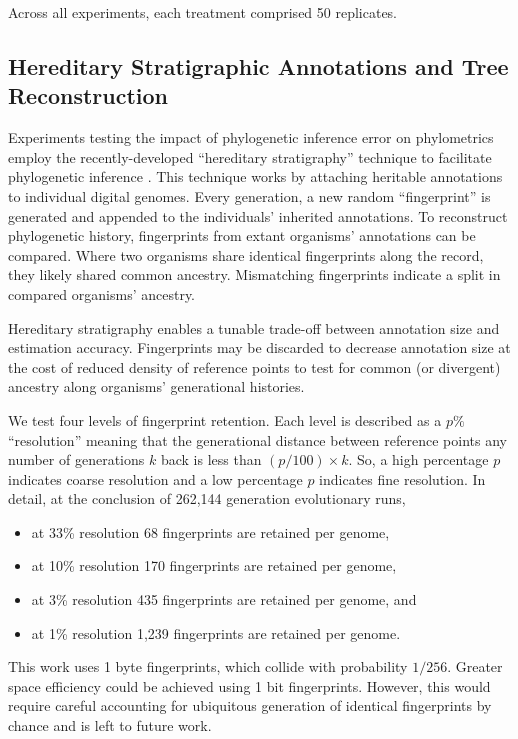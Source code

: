 Across all experiments, each treatment comprised 50 replicates.

\subsection{Hereditary Stratigraphic Annotations and Tree Reconstruction}

Experiments testing the impact of phylogenetic inference error on phylometrics employ the recently-developed ``hereditary stratigraphy'' technique to facilitate phylogenetic inference \citep{moreno2022hstrat}.
This technique works by attaching heritable annotations to individual digital genomes.
Every generation, a new random ``fingerprint'' is generated and appended to the individuals' inherited annotations.
To reconstruct phylogenetic history, fingerprints from extant organisms' annotations can be compared.
Where two organisms share identical fingerprints along the record, they likely shared common ancestry.
Mismatching fingerprints indicate a split in compared organisms' ancestry.

Hereditary stratigraphy enables a tunable trade-off between annotation size and estimation accuracy.
Fingerprints may be discarded to decrease annotation size at the cost of reduced density of reference points to test for common (or divergent) ancestry along organisms' generational histories.

We test four levels of fingerprint retention.
Each level is described as a $p\%$ ``resolution'' meaning that the generational distance between reference points any number of generations $k$ back is less than $(p / 100) \times k$.
So, a high percentage $p$ indicates coarse resolution and a low percentage $p$ indicates fine resolution.
In detail, at the conclusion of 262,144 generation evolutionary runs,
\begin{itemize}
  \item at 33\% resolution 68 fingerprints are retained per genome,
  \item at 10\% resolution 170 fingerprints are retained per genome,
  \item at 3\% resolution 435 fingerprints are retained per genome, and
  \item at 1\% resolution 1,239 fingerprints are retained per genome.
\end{itemize}

This work uses 1 byte fingerprints, which collide with probability $1/256$.
Greater space efficiency could be achieved using 1 bit fingerprints.
However, this would require careful accounting for ubiquitous generation of identical fingerprints by chance and is left to future work.

